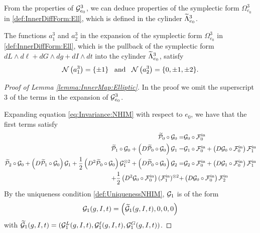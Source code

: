 From the properties of $\mathcal{G}_{e_0}^3$, we can deduce properties of the symplectic form $\Omega_{e_0}^3$ in \eqref{def:InnerDiffForm:Ell}, which is defined in the cylinder $\widetilde\Lambda_{e_0}^3$.
\begin{corollary}\label{coro:SymplecticForm}
 The functions $a_1^3$ and $a_2^3$ in the expansion of the symplectic form $\Omega_{e_0}^3$ in \eqref{def:InnerDiffForm:Ell}, which is the pullback of 
 the symplectic form $dL\wedge d\ell+dG\wedge dg+dI\wedge dt$ into the cylinder $\widetilde\Lambda_{e_0}^3$, satisfy
\[
 \mathcal{N}\left(a_1^3\right)=\{\pm 1\}\,\,\,\text{ and }\,\,\,\mathcal{N}\left(a_2^3\right)=\{0,\pm 1,\pm 2\}.
\]
\end{corollary}


\begin{proof}[Proof of Lemma \ref{lemma:InnerMap:Elliptic}]
In the proof we omit the superscript $3$ of the terms in the expansion of $\mathcal{G}^3_{e_0}$.

  Expanding equation \eqref{eq:Invariance:NHIM} with respect to $e_0$, we have that  the first terms satisfy
  \begin{align}
    \widetilde{\mathcal{P}}_0\circ \mathcal{G}_0=&\mathcal{G}_0\circ\mathcal{F}^{\mathrm{in}}_0\label{eq:Invariance:NHIM:0}\\
    \widetilde{\mathcal{P}}_1\circ\mathcal{G}_0+\left(D\widetilde{\mathcal{P}}_0\circ\mathcal{G}_0\right)\mathcal{G}_1=&\mathcal{G}_1\circ\mathcal{F}_0^{\mathrm{in}}+
    \left(D\mathcal{G}_0\circ\mathcal{F}_0^{\mathrm{in}}\right)\mathcal{F}_1^{\mathrm{in}}\label{eq:Invariance:NHIM:1}\\
    \widetilde{\mathcal{P}}_2\circ\mathcal{G}_0+\left(D\widetilde{\mathcal{P}}_1\circ\mathcal{G}_0\right)\mathcal{G}_1+
    \frac{1}{2}\left(D^2\widetilde{\mathcal{P}}_0\circ\mathcal{G}_0\right)\mathcal{G}_1^{\otimes 2}
    +\left(D\widetilde{\mathcal{P}}_0\circ\mathcal{G}_0\right)\mathcal{G}_2=&\mathcal{G}_2\circ\mathcal{F}_0^{\mathrm{in}}+
    \left(D\mathcal{G}_1\circ\mathcal{F}_0^{\mathrm{in}}\right)\mathcal{F}_1^{\mathrm{in}}\nonumber\\
    +\frac{1}{2}\left(D^2\mathcal{G}_0\circ\mathcal{F}_0^{\mathrm{in}}\right)(\mathcal{F}_1^{\mathrm{in}})^{\otimes 2}+
    &\left(D\mathcal{G}_0\circ\mathcal{F}_0^{\mathrm{in}}\right)\mathcal{F}_2^{\mathrm{in}}\label{eq:Invariance:NHIM:2}
  \end{align}
  By the uniqueness condition \eqref{def:UniquenessNHIM},  $\mathcal{G}_{1}$ is of the form
  \[
  \mathcal{G}_1(g,I,t)=\left(\widetilde {\mathcal{G}}_1(g,I,t),0,0,0\right)
  \]
  with $\widetilde {\mathcal{G}}_1(g,I,t)=(\mathcal{G}_1^L(g,I,t),\mathcal{G}_1^\ell(g,I,t),\mathcal{G}_1^G(g,I,t))$.


\end{proof}
